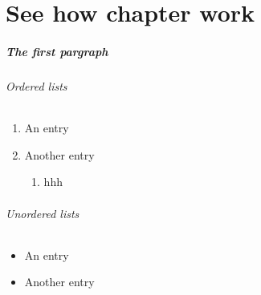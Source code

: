 \documentclass{report}
\begin{document}
\chapter{See how chapter work}
\paragraph{The first pargraph}
\subparagraph{Ordered lists}
\begin{enumerate}
    \item An entry
    \item Another entry
    \begin{enumerate}
        \item hhh
    \end{enumerate}
\end{enumerate}

\subparagraph{Unordered lists}
\begin{itemize}
    \item An entry
    \item Another entry
\end{itemize}
\end{document}
